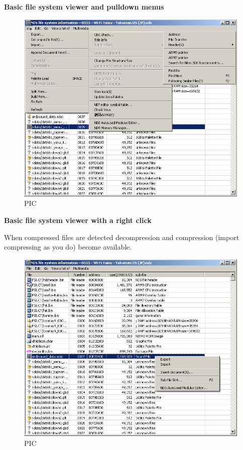 \documentclass[
]{book}
\begin{document}
\textbf{Basic file system viewer and pulldown menus}

\begin{figure}
\centering
\includegraphics{images/221_home_fast6191_romhackingguide_unrenamed_fil___inal_borders_romhackguidecrystaltile2usage2.png}
\caption{PIC}
\end{figure}

\textbf{Basic file system viewer with a right click}

When compressed files are detected decompression and compression (import compressing as you do) become available.

\begin{figure}
\centering
\includegraphics{images/222_home_fast6191_romhackingguide_unrenamed_fil___inal_borders_romhackguidecrystaltile2usage3.png}
\caption{PIC}
\end{figure}
\end{document}
